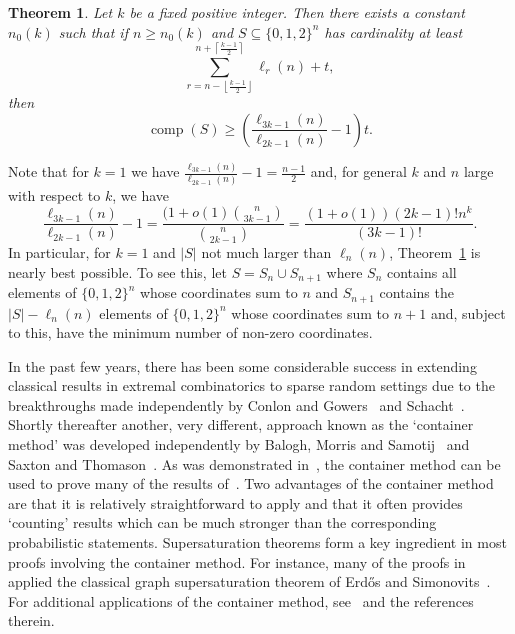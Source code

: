 \documentclass[11 pt]{article}
\newtheorem{thm}[equation]{Theorem}
\theoremstyle{definition}
\theoremstyle{case}
\numberwithin{equation}{section}
\DeclareMathOperator{\comp}{comp}
\begin{document}
\begin{thm}
\label{multisetThm}
Let $k$ be a fixed positive integer. Then there exists a constant $n_0(k)$ such that if $n\geq n_0(k)$ and $S\subseteq \{0,1,2\}^n$ has cardinality at least 
\[\sum_{r =n-\left\lfloor \frac{k-1}{2}\right\rfloor}^{n+\left\lceil \frac{k-1}{2}\right\rceil}\ell_{r}(n)+ t,\] 
then
\[\comp(S)\geq \left(\frac{\ell_{3k-1}(n)}{\ell_{2k-1}(n)} - 1\right)t.\]
\end{thm}

Note that for $k=1$ we have $\frac{\ell_{3k-1}(n)}{\ell_{2k-1}(n)} - 1 = \frac{n-1}{2}$ and, for general $k$ and $n$ large with respect to $k$, we have 
\begin{equation}\label{ratioAsymp}\frac{\ell_{3k-1}(n)}{\ell_{2k-1}(n)} - 1 = \frac{(1+o(1)\binom{n}{3k-1}}{\binom{n}{2k-1}} = \frac{(1+o(1))(2k-1)!n^k}{(3k-1)!}.\end{equation}
In particular, for $k=1$ and $|S|$ not much larger than $\ell_n(n)$, Theorem~\ref{multisetThm} is nearly best possible. To see this, let $S = S_n\cup S_{n+1}$ where $S_n$ contains all elements of $\{0,1,2\}^n$ whose coordinates sum to $n$ and $S_{n+1}$ contains the $|S|-\ell_n(n)$ elements of $\{0,1,2\}^n$ whose coordinates sum to $n+1$ and, subject to this, have the minimum number of non-zero coordinates. 

In the past few years, there has been some considerable success in extending classical results in extremal combinatorics to sparse random settings due to the breakthroughs 
made independently by Conlon and Gowers~\cite{ConlonGowers} and Schacht~\cite{Schacht}. Shortly thereafter another, very different, approach known as the `container method' 
was developed independently by Balogh, Morris and Samotij~\cite{ContainersMorris} and Saxton and Thomason~\cite{ContainersThomason}. As was demonstrated 
in~\cite{ContainersThomason,ContainersMorris}, the container method can be used to prove many of the results of~\cite{ConlonGowers,Schacht}. Two advantages of the container 
method are that it is relatively straightforward to apply and that it often provides `counting' results which can be much stronger than the corresponding probabilistic 
statements. Supersaturation theorems form a key ingredient in most proofs involving the container method. For instance, many of the proofs 
in~\cite{ContainersThomason,ContainersMorris} applied the classical graph supersaturation theorem of Erd\H{o}s and Simonovits~\cite{Hyper}. For additional applications of the 
container method, see~\cite{BaloghWagnerBoolean,GraphCont,HongNew} and the references therein.
\end{document}
